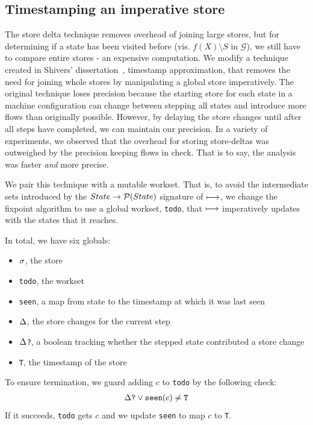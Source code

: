 \documentclass[preprint,onecolumn,9pt]{sigplanconf} %
\begin{document}

\subsection{Timestamping an imperative store}

The store delta technique removes overhead of joining large stores,
but for determining if a state has been visited before (vis. $f(X)
\setminus S$ in ${\mathcal G}$), we still have to compare entire stores - an
expensive computation.  We modify a technique created in Shivers'
dissertation~\cite{ianjohnson:Shivers:1991:CFA}, timestamp
approximation, that removes the need for joining whole stores by
manipulating a global store imperatively. The original technique loses
precision because the starting store for each state in a machine
configuration can change between stepping all states and introduce
more flows than originally possible. However, by delaying the store
changes until after all steps have completed, we can maintain our
precision. In a variety of experiments, we observed that the overhead
for storing store-deltas was outweighed by the precision keeping flows
in check. That is to say, the analysis was faster {\it and} more
precise.

We pair this technique with a mutable workset. That is, to avoid the
intermediate sets introduced by the $State \to \mathcal{P}(State)$ signature
of $\longmapsto$, we change the fixpoint algorithm to use a global
workset, {\tt todo}, that $\longmapsto$ imperatively updates with the
states that it reaches.

In total, we have six globals:
\begin{itemize}
 \item{{\tt $\sigma$}, the store}
 \item{{\tt todo}, the workset}
 \item{{\tt seen}, a map from state to the timestamp at which it was last seen}
 \item{{\tt $\Delta$}, the store changes for the current step}
 \item{{\tt $\Delta$?}, a boolean tracking whether the stepped state contributed a store change}
 \item{{\tt T}, the timestamp of the store}
\end{itemize}

To ensure termination, we guard adding $c$ to {\tt todo} by the following check:
\begin{align*}\Delta\mbox{{\tt ?}} \vee {\tt seen}(c) \neq {\tt T}\end{align*}
If it succeeds, {\tt todo} gets $c$ and we update {\tt seen} to map $c$ to {\tt T}.
\end{document}
